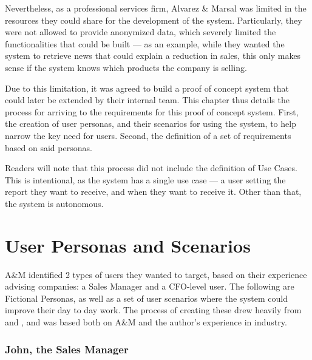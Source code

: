\documentclass[a4paper]{report}
\begin{document}
Nevertheless, as a professional services firm, Alvarez \& Marsal was limited in the resources they could share for the development of the system. Particularly, they were not allowed to provide anonymized data, which severely limited the functionalities that could be built --- as an example, while they wanted the system to retrieve news that could explain a reduction in sales, this only makes sense if the system knows which products the company is selling.

Due to this limitation, it was agreed to build a proof of concept system that could later be extended by their internal team. This chapter thus details the process for arriving to the requirements for this proof of concept system. First, the creation of user personas, and their scenarios for using the system, to help narrow the key need for users. Second, the definition of a set of requirements based on said personas.

Readers will note that this process did not include the definition of Use Cases. This is intentional, as the system has a single use case --- a user setting the report they want to receive, and when they want to receive it. Other than that, the system is autonomous.

\section{User Personas and Scenarios}

A\&M identified 2 types of users they wanted to target, based on their experience advising companies: a Sales Manager and a CFO-level user. The following are Fictional Personas, as well as a set of user scenarios where the system could improve their day to day work. The process of creating these drew heavily from \cite{ixdf_personas_2025} and \cite{ixdf_user_scenarios_2025}, and was based both on A\&M and the author's experience in industry.

\subsubsection{John, the Sales Manager}
\end{document}
